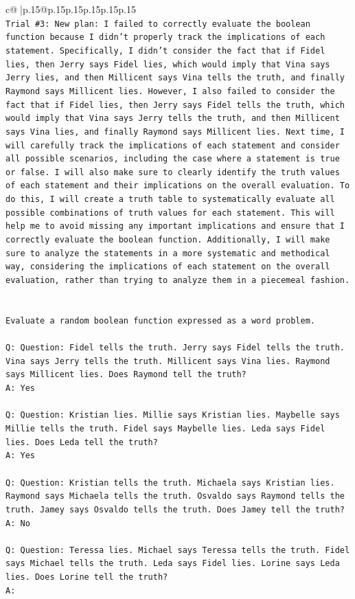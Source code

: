 \documentclass{article}
\begin{document}
{\begin{supertabular}{c@{$\;$}|p{.15\linewidth}@{}p{.15\linewidth}p{.15\linewidth}p{.15\linewidth}p{.15\linewidth}p{.15\linewidth}}
{{{\\ 
\texttt{Trial \#3: New plan: I failed to correctly evaluate the boolean function because I didn't properly track the implications of each statement. Specifically, I didn't consider the fact that if Fidel lies, then Jerry says Fidel lies, which would imply that Vina says Jerry lies, and then Millicent says Vina tells the truth, and finally Raymond says Millicent lies. However, I also failed to consider the fact that if Fidel lies, then Jerry says Fidel tells the truth, which would imply that Vina says Jerry tells the truth, and then Millicent says Vina lies, and finally Raymond says Millicent lies. Next time, I will carefully track the implications of each statement and consider all possible scenarios, including the case where a statement is true or false. I will also make sure to clearly identify the truth values of each statement and their implications on the overall evaluation. To do this, I will create a truth table to systematically evaluate all possible combinations of truth values for each statement. This will help me to avoid missing any important implications and ensure that I correctly evaluate the boolean function. Additionally, I will make sure to analyze the statements in a more systematic and methodical way, considering the implications of each statement on the overall evaluation, rather than trying to analyze them in a piecemeal fashion.} \\
\\ 
\\ 
\texttt{Evaluate a random boolean function expressed as a word problem.} \\
\\ 
\texttt{Q: Question: Fidel tells the truth. Jerry says Fidel tells the truth. Vina says Jerry tells the truth. Millicent says Vina lies. Raymond says Millicent lies. Does Raymond tell the truth?} \\
\texttt{A: Yes} \\
\\ 
\texttt{Q: Question: Kristian lies. Millie says Kristian lies. Maybelle says Millie tells the truth. Fidel says Maybelle lies. Leda says Fidel lies. Does Leda tell the truth?} \\
\texttt{A: Yes} \\
\\ 
\texttt{Q: Question: Kristian tells the truth. Michaela says Kristian lies. Raymond says Michaela tells the truth. Osvaldo says Raymond tells the truth. Jamey says Osvaldo tells the truth. Does Jamey tell the truth?} \\
\texttt{A: No} \\
\\ 
\texttt{Q: Question: Teressa lies. Michael says Teressa tells the truth. Fidel says Michael tells the truth. Leda says Fidel lies. Lorine says Leda lies. Does Lorine tell the truth?} \\
\texttt{A:} \\
            }
        }
    }
     \\ \\


\end{supertabular}}
\end{document}
